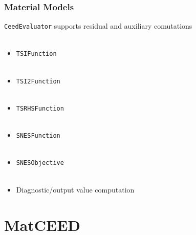 \documentclass{beamer}
\begin{document}
\begin{frame}[fragile]
\begin{center}
\frametitle{Material Models}

\lstinline{CeedEvaluator} supports residual and auxiliary comutations\\

~\\

\begin{itemize}

\item \lstinline{TSIFunction}\\

~\\

\item \lstinline{TSI2Function}\\

~\\

\item \lstinline{TSRHSFunction}\\

~\\

\item \lstinline{SNESFunction}\\

~\\

\item \lstinline{SNESObjective}\\

~\\

\item Diagnostic/output value computation

\end{itemize}

\end{center}
\end{frame}

\section{MatCEED}
\end{document}
